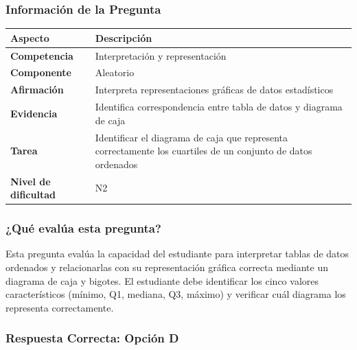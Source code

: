 \documentclass[
]{article}
\begin{document}
\subsubsection{Información de la
Pregunta}\label{informaciuxf3n-de-la-pregunta}

\begin{longtable}[]{@{}
  >{\raggedright\arraybackslash}p{}
  >{\raggedright\arraybackslash}p{}@{}}
\toprule\noalign{}
\begin{minipage}[b]{\linewidth}\raggedright
Aspecto
\end{minipage} & \begin{minipage}[b]{\linewidth}\raggedright
Descripción
\end{minipage} \\
\midrule\noalign{}
\endhead
\bottomrule\noalign{}
\endlastfoot
\textbf{Competencia} & Interpretación y representación \\
\textbf{Componente} & Aleatorio \\
\textbf{Afirmación} & Interpreta representaciones gráficas de datos
estadísticos \\
\textbf{Evidencia} & Identifica correspondencia entre tabla de datos y
diagrama de caja \\
\textbf{Tarea} & Identificar el diagrama de caja que representa
correctamente los cuartiles de un conjunto de datos ordenados \\
\textbf{Nivel de dificultad} & N2 \\
\end{longtable}

\subsubsection{¿Qué evalúa esta
pregunta?}\label{quuxe9-evaluxfaa-esta-pregunta}

Esta pregunta evalúa la capacidad del estudiante para interpretar tablas
de datos ordenados y relacionarlas con su representación gráfica
correcta mediante un diagrama de caja y bigotes. El estudiante debe
identificar los cinco valores característicos (mínimo, Q1, mediana, Q3,
máximo) y verificar cuál diagrama los representa correctamente.

\subsubsection{Respuesta Correcta: Opción
D}\label{respuesta-correcta-opciuxf3n-d}
\end{document}
